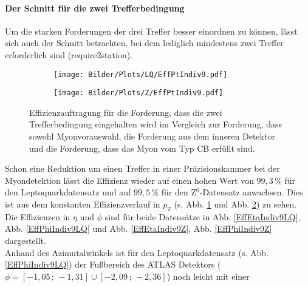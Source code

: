 \paragraph{Der Schnitt für die zwei Trefferbedingung}$~~$\\
Um die starken Forderungen der drei Treffer besser einordnen zu können, lässt sich auch der Schnitt betrachten, bei dem lediglich mindestens zwei Treffer erforderlich sind (require2station).\\
\begin{figure}
  \begin{subfigure}[t]{0.55\textwidth}
  \texttt{[image: Bilder/Plots/LQ/EffPtIndiv9.pdf]}
  \label{EffPtIndiv9LQ}
  \end{subfigure}
\begin{subfigure}[t]{0.55\textwidth}
 \texttt{[image: Bilder/Plots/Z/EffPtIndiv9.pdf]}
  \label{EffPtIndiv9Z}
\end{subfigure}
\caption{Effizienzauftragung für die Forderung, dass die zwei Trefferbedingung eingehalten wird im Vergleich zur Forderung, dass sowohl Myonvorauswahl, die Forderung aus dem inneren Detektor und die Forderung, dass das Myon vom Typ CB erfüllt sind.}
\label{EffPtIndiv9}
\end{figure}
Schon eine Reduktion um einen Treffer in einer Präzisionskammer bei der Myondetektion lässt die Effizienz wieder auf einen hohen Wert von $99,3\,\%$ für den Leptoquarkdatensatz und auf $99,5\,\%$ für den Z$^0$-Datensatz anwachsen. Dies ist aus dem konstanten Effizienzverlauf in $p_T$ (s. Abb. \ref{EffPtIndiv9LQ} und Abb. \ref{EffPtIndiv9Z}) zu sehen. Die Effizienzen in $\eta$ und $\phi$ sind für beide Datensätze in Abb. \ref{EffEtaIndiv9LQ}, Abb. \ref{EffPhiIndiv9LQ} und Abb. \ref{EffEtaIndiv9Z}, Abb. \ref{EffPhiIndiv9Z} dargestellt.\\
Anhand des Azimutalwinkels ist für den Leptoquarkdatensatz (s. Abb. \ref{EffPhiIndiv9LQ}) der Fußbereich des ATLAS Detektors ($\phi=[-1,05\,;\,-1,31]\cup[-2,09\,;\,-2,36]$) noch leicht mit einer
